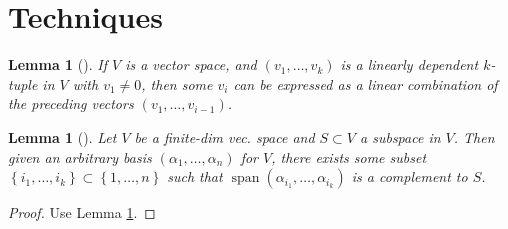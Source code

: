 \documentclass[a4paper]{article}
\theoremstyle{plain}%
\newtheorem{lemma}[theorem]{Lemma}
\theoremstyle{definition}
\theoremstyle{remark}
\DeclareMathOperator{\Span}{span}
\begin{document}
\section{Techniques}

\begin{lemma}[]\label{linear-dependence-preceding}
    If $V$ is a vector space, and $\left( v_1, \ldots,
    v_k \right) $ is a linearly dependent $k$-tuple in $V$ with
    $v_1 \neq 0$, then some $v_i$ can be expressed as a linear combination of
    the \textit{preceding} vectors
    $\left( v_1, \ldots, v_{i-1} \right) $.
\end{lemma}

\begin{lemma}[]
    Let $V$ be a finite-dim vec. space and
    $S \subset V$ a subspace in $V$. Then given an arbitrary basis
    $\left( \alpha_1, \ldots, \alpha_n \right) $ for $V$, there exists some
    subset $\left\{ i_1, \ldots, i_k \right\} \subset 
    \left\{ 1, \ldots, n \right\} $ such that
    $\Span \left( \alpha_{i_1}, \ldots,
    \alpha_{i_k} \right) $ is a complement to $S$.
\end{lemma}

\begin{proof}
    Use Lemma \ref{linear-dependence-preceding}.
\end{proof}
\end{document}
